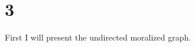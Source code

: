 \section*{3}
First I will present the undirected moralized graph.
\begin{tikzpicture}
  

\end{tikzpicture}
